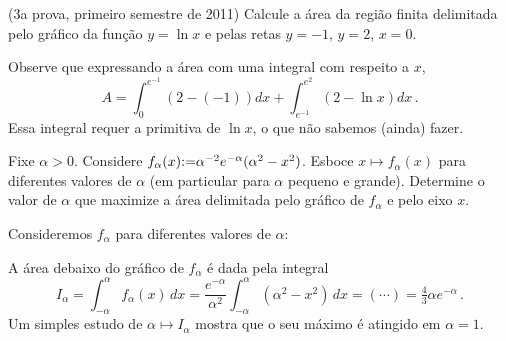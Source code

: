 \begin{exo}(3a prova, primeiro semestre de 2011)
Calcule a área da região finita delimitada pelo gráfico da função $y=\ln x$ e
pelas retas $y=-1$, $y=2$, $x=0$.
\begin{sol}\mbox{}
\begin{center}
\begin{bmlimage}\end{bmlimage}
\end{center}
Observe que expressando a área com uma integral com respeito a $x$, 
$$A=\int_0^{e^{-1}}(2-(-1))dx+\int_{e^{-1}}^{e^2}(2-\ln x)
dx\,.$$
Essa integral requer a primitiva de $\ln x$, o que não
sabemos (ainda) fazer.
\end{sol}
\end{exo}

\begin{exo} Fixe $\alpha>0$.
Considere $f_\alpha(x){:=} \alpha^{-2}e^{-\alpha}(\alpha^2-x^2)$. Esboce
$x\mapsto f_\alpha(x)$ para diferentes valores de $\alpha$ (em particular para
$\alpha$
pequeno e grande). Determine o valor de $\alpha$ que maximize a área delimitada
pelo gráfico de $f_\alpha$ e pelo eixo $x$.
\begin{sol}
Consideremos $f_\alpha$ para diferentes valores de $\alpha$:
\begin{center}
\begin{bmlimage}\end{bmlimage}
\end{center}
A área debaixo do gráfico de $f_\alpha$ é dada pela integral 
$$
I_\alpha=\int_{-\alpha}^\alpha f_\alpha(x)\,dx=\frac{e^{-\alpha}}{\alpha^2}
\int_{-\alpha}^\alpha(\alpha^2-x^2)\,dx=(\cdots)=\tfrac43 \alpha
e^{-\alpha}\,.$$
Um simples estudo de $\alpha\mapsto I_\alpha$ mostra que o seu máximo é
atingido em $\alpha=1$.
\end{sol}
\end{exo}

